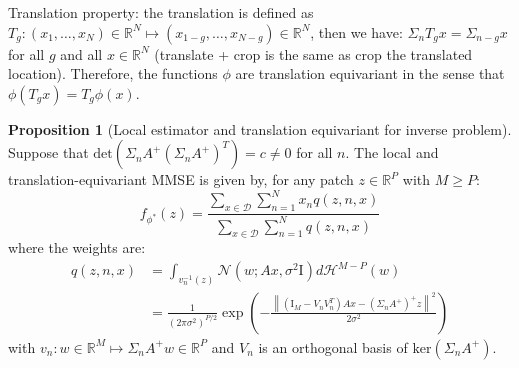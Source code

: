 \documentclass[a4paper,10pt]{article}
\theoremstyle{definition} %
\theoremstyle{definition} %
\newtheorem{proposition}[definition]{Proposition}
\theoremstyle{definition} %
\theoremstyle{definition} %
\newcommand{\R}{\mathbb{R}}
\newcommand{\Normal}[1]{\mathcal{N}\left( {#1} \right)}
\renewcommand{\ker}[1]{\mathrm{ker}\left( {#1} \right)}
\newcommand{\Id}{\mathrm{I}}
\newcommand{\norm}[1]{\left\| #1 \right \|}
\newcommand{\0}{\boldsymbol{0}}
\renewcommand{\H}{\mathcal{H}}
\newcommand{\D}{\mathcal{D}}
\renewcommand{\det}[1]{\mathrm{det}\left( #1 \right)}
\begin{document}
Translation property: the translation is defined as $T_g : (x_1, \dots, x_N) \in \R^N \mapsto (x_{1 - g}, \dots, x_{N - g}) \in \R^N$, then we have: $\Sigma_n T_g x = \Sigma_{n - g} x$ for all $g$ and all $x \in \R^N$ (translate + crop is the same as crop the translated location). Therefore, the functions $\phi$ are translation equivariant in the sense that $\phi(T_g x) = T_g \phi(x)$.
\begin{proposition}[Local estimator and translation equivariant for inverse problem]
    Suppose that $\det{\Sigma_n A^+ (\Sigma_n A^+)^T} = c \neq 0$ for all $n$.
    The local and translation-equivariant MMSE is given by, for any patch $z \in \R^P$ with $M \geqslant P$: 
    \begin{equation*}
        f_{\phi^*}(z) = \frac{\sum_{x \in \D} \sum_{n = 1}^{N} x_n q(z, n, x)}{\sum_{x \in \D} \sum_{n = 1}^{N} q(z, n, x)}
    \end{equation*}
    where the weights are: 
    \begin{align*}
        q(z, n, x) &= \int_{v_n^{-1}(z)} \Normal{w; A x, \sigma^2 \Id} d \H^{M - P}(w) 
        \\&= \frac{1}{(2\pi \sigma^2)^{P/2}} \exp \left( -\frac{\norm{(\Id_M - V_n V_n^T)A x - (\Sigma_n A^+)^+ z}^2}{2\sigma^2} \right)
    \end{align*}
    with $v_n: w \in \R^M \mapsto \Sigma_n A^+ w \in \R^P$ and $V_n$ is an orthogonal basis of $\ker{\Sigma_n A^+}$.
\end{proposition}
\end{document}
